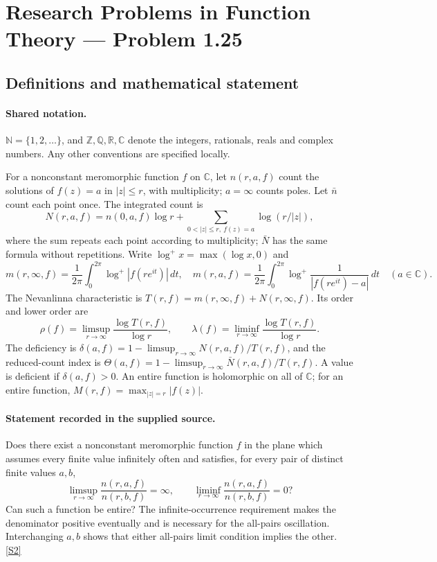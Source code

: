 \documentclass[11pt]{article}
\newcommand{\sref}[2]{\hyperlink{source:#1:#2}{[S#2]}}
\begin{document}
\section{Research Problems in Function Theory — Problem 1.25}\label{statement}

\subsection{Definitions and mathematical statement}

\paragraph{Shared notation.}$\mathbb N=\{1,2,\ldots\}$, and $\mathbb Z,\mathbb Q,\mathbb R,\mathbb C$ denote the integers, rationals, reals and complex numbers. Any other conventions are specified locally.


For a nonconstant meromorphic function $f$ on $\mathbb C$, let $n(r,a,f)$ count the solutions of $f(z)=a$ in $|z|\le r$, with multiplicity; $a=\infty$ counts poles. Let $\bar n$ count each point once. The integrated count is
\[
 N(r,a,f)=n(0,a,f)\log r+\sum_{0<|z|\le r,\ f(z)=a}\log(r/|z|),
\]
where the sum repeats each point according to multiplicity; $\bar N$ has the same formula without repetitions. Write $\log^+x=\max(\log x,0)$ and
\[
 m(r,\infty,f)=\frac1{2\pi}\int_0^{2\pi}\log^+|f(re^{it})|\,dt,\quad
 m(r,a,f)=\frac1{2\pi}\int_0^{2\pi}\log^+\frac1{|f(re^{it})-a|}\,dt\quad(a\in\mathbb C).
\]
The Nevanlinna characteristic is $T(r,f)=m(r,\infty,f)+N(r,\infty,f)$. Its order and lower order are
\[
 \rho(f)=\limsup_{r\to\infty}\frac{\log T(r,f)}{\log r},\qquad
 \lambda(f)=\liminf_{r\to\infty}\frac{\log T(r,f)}{\log r}.
\]
The deficiency is $\delta(a,f)=1-\limsup_{r\to\infty}N(r,a,f)/T(r,f)$, and the reduced-count index is $\Theta(a,f)=1-\limsup_{r\to\infty}\bar N(r,a,f)/T(r,f)$. A value is deficient if $\delta(a,f)>0$. An entire function is holomorphic on all of $\mathbb C$; for an entire function, $M(r,f)=\max_{|z|=r}|f(z)|$.
\paragraph{Statement recorded in the supplied source.}
Does there exist a nonconstant meromorphic function $f$ in the plane which assumes every finite value infinitely often and satisfies, for every pair of distinct finite values $a,b$,
\[
 \limsup_{r\to\infty}\frac{n(r,a,f)}{n(r,b,f)}=\infty,\qquad
 \liminf_{r\to\infty}\frac{n(r,a,f)}{n(r,b,f)}=0?
\]
Can such a function be entire? The infinite-occurrence requirement makes the denominator positive eventually and is necessary for the all-pairs oscillation. Interchanging $a,b$ shows that either all-pairs limit condition implies the other. \sref{statement}{2}
\end{document}
